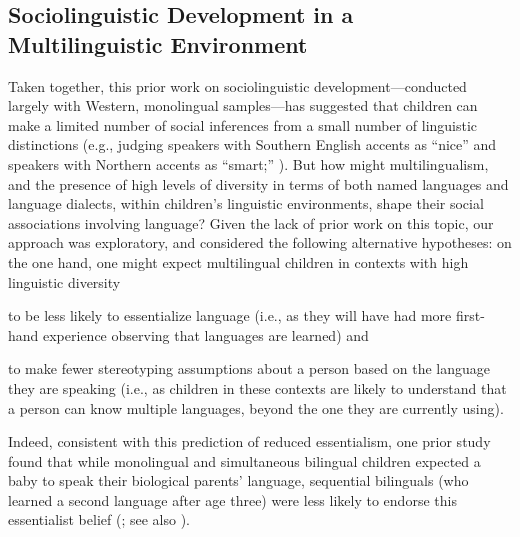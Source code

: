 \documentclass{foushee-adapted-preprint}
\begin{document}
\subsection*{Sociolinguistic Development in a Multilinguistic Environment}
Taken together, this prior work on sociolinguistic development---conducted largely with Western, monolingual samples---has suggested that children can make a limited number of social inferences from a small number of linguistic distinctions (e.g., judging speakers with Southern English accents as ``nice'' and speakers with Northern accents as ``smart;'' \cite{kinzler2013northern}). 
But how might multilingualism, and the presence of high levels of diversity in terms of both named languages and language dialects, within children's linguistic environments, shape their social associations involving language? %
Given the lack of prior work on this topic, our approach was exploratory, and considered the following alternative hypotheses: on the one hand, one might expect multilingual children in contexts with high linguistic diversity 
\begin{inparaenum}[(1)]
    \item to be less likely to essentialize language (i.e., as they will have had more first-hand experience observing that languages are learned) and
    \item to make fewer stereotyping assumptions about a person based on the language they are speaking (i.e., as children in these contexts are likely to understand that a person can know multiple languages, beyond the one they are currently using).
\end{inparaenum} 
Indeed, consistent with this prediction of reduced essentialism, one prior study found that while monolingual and simultaneous bilingual children expected a baby to speak their biological parents' language, sequential bilinguals (who learned a second language after age three) were less likely to endorse this essentialist belief (\cite{byers2015bilingualism}; see also \cite{dautel2018once}).
\end{document}
